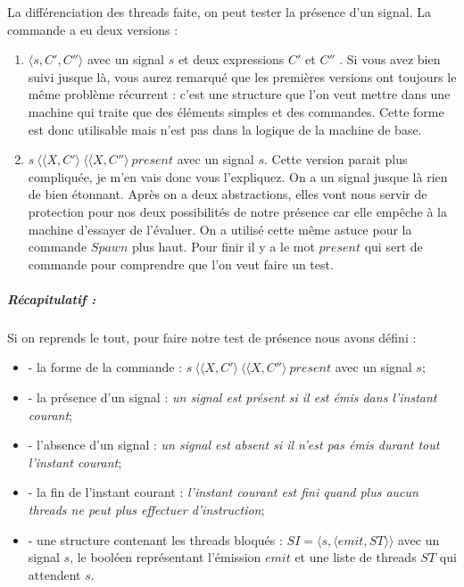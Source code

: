 \documentclass[10pt,a4paper]{article}
\begin{document}
					La différenciation des threads faite, on peut tester la présence d'un signal. La commande a eu deux versions :
					\begin{enumerate}
						\item $\langle s,C',C''\rangle$ avec un signal $s$ et deux expressions $C'$ et $C''$ . Si vous avez bien suivi jusque là, vous aurez remarqué que les premières versions ont toujours le même problème récurrent : c'est une structure que l'on veut mettre dans une machine qui traite que des éléments simples et des commandes. Cette forme est donc utilisable mais n'est pas dans la logique de la machine de base.
						\item $s~\langle\langle X,C'\rangle~\langle\langle X,C''\rangle~present$ avec un signal $s$. Cette version parait plus compliquée, je m'en vais donc vous l'expliquez. On a un signal jusque là rien de bien étonnant. Après on a deux abstractions, elles vont nous servir de protection pour nos deux possibilités de notre présence car elle empêche à la machine d'essayer de l'évaluer. On a utilisé cette même astuce pour la commande $Spawn$ plus haut. Pour finir il y a le mot $present$ qui sert de commande pour comprendre que l'on veut faire un test.
					\end{enumerate} 
					\bigbreak
						
						
					\subparagraph{Récapitulatif :} Si on reprends le tout, pour faire notre test de présence nous avons défini :
					\begin{itemize}
						\item[] - la forme de la commande : $s~\langle\langle X,C'\rangle~\langle\langle X,C''\rangle~present$ avec un signal $s$;
						\item[] - la présence d'un signal : \textit{un signal est présent si il est émis dans l'instant courant};
						\item[] - l'absence d'un signal : \textit{un signal est absent si il n'est pas émis durant tout l'instant courant};
						\item[] - la fin de l'instant courant : \textit{l'instant courant est fini quand plus aucun threads ne peut plus effectuer d'instruction};
						\item[] - une structure contenant les threads bloqués : $SI = \langle s , \langle emit , ST \rangle\rangle$ avec un signal $s$, le booléen représentant l'émission $emit$ et une liste de threads  $ST$ qui attendent $s$.
					\end{itemize}
					\bigbreak
					\bigbreak
						
\end{document}

